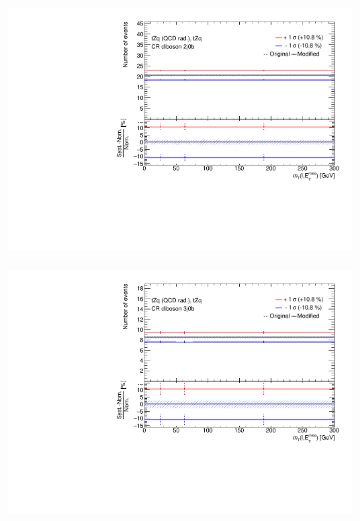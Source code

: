 \begin{figure}[!h]
\begin{subfigure}[b]{0.33\linewidth}
    \includegraphics[width=\textwidth]{ubonn-thesis/Chapters/Chapters_07/Figure/Data/Systematic/tZq_qcdrad/CR_2j0b_tZq_tZq_XS_QCDscale.pdf} 
    \caption{}
  \end{subfigure}%
   \begin{subfigure}[b]{0.33\linewidth}
  \centering
    \includegraphics[width=\textwidth]{ubonn-thesis/Chapters/Chapters_07/Figure/Data/Systematic/tZq_qcdrad/CR_3j0b_tZq_tZq_XS_QCDscale.pdf} 
    \caption{}
  \end{subfigure}%
  \newline
  \centering
  \begin{subfigure}[b]{0.33\linewidth}

\end{subfigure}
\end{figure}
